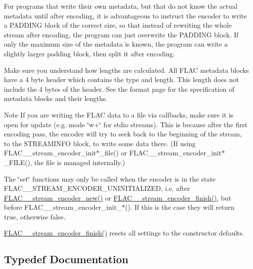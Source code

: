 For programs that write their own metadata, but that do not know the actual metadata until after encoding, it is advantageous to instruct the encoder to write a P\+A\+D\+D\+I\+NG block of the correct size, so that instead of rewriting the whole stream after encoding, the program can just overwrite the P\+A\+D\+D\+I\+NG block. If only the maximum size of the metadata is known, the program can write a slightly larger padding block, then split it after encoding.

Make sure you understand how lengths are calculated. All F\+L\+AC metadata blocks have a 4 byte header which contains the type and length. This length does not include the 4 bytes of the header. See the format page for the specification of metadata blocks and their lengths.

\begin{DoxyNote}{Note}
If you are writing the F\+L\+AC data to a file via callbacks, make sure it is open for update (e.\+g. mode \char`\"{}w+\char`\"{} for stdio streams). This is because after the first encoding pass, the encoder will try to seek back to the beginning of the stream, to the S\+T\+R\+E\+A\+M\+I\+N\+FO block, to write some data there. (If using F\+L\+A\+C\+\_\+\+\_\+stream\+\_\+encoder\+\_\+init$\ast$\+\_\+file() or F\+L\+A\+C\+\_\+\+\_\+stream\+\_\+encoder\+\_\+init$\ast$\+\_\+\+F\+I\+LE(), the file is managed internally.)

The \char`\"{}set\char`\"{} functions may only be called when the encoder is in the state F\+L\+A\+C\+\_\+\+\_\+\+S\+T\+R\+E\+A\+M\+\_\+\+E\+N\+C\+O\+D\+E\+R\+\_\+\+U\+N\+I\+N\+I\+T\+I\+A\+L\+I\+Z\+ED, i.\+e. after \hyperlink{group__flac__stream__encoder_ga35f3d94452bcf0a90a31c7d770b200bc}{F\+L\+A\+C\+\_\+\+\_\+stream\+\_\+encoder\+\_\+new()} or \hyperlink{group__flac__stream__encoder_gab2c1e5477c1e3fe9ad0d722ff8eecda2}{F\+L\+A\+C\+\_\+\+\_\+stream\+\_\+encoder\+\_\+finish()}, but before F\+L\+A\+C\+\_\+\+\_\+stream\+\_\+encoder\+\_\+init\+\_\+$\ast$(). If this is the case they will return {\ttfamily true}, otherwise {\ttfamily false}.

\hyperlink{group__flac__stream__encoder_gab2c1e5477c1e3fe9ad0d722ff8eecda2}{F\+L\+A\+C\+\_\+\+\_\+stream\+\_\+encoder\+\_\+finish()} resets all settings to the constructor defaults. 
\end{DoxyNote}


\subsection{Typedef Documentation}
\mbox{\label{group__flac__stream__encoder_ga091fbf3340d85bcbda1090c31bc320cf}} 
